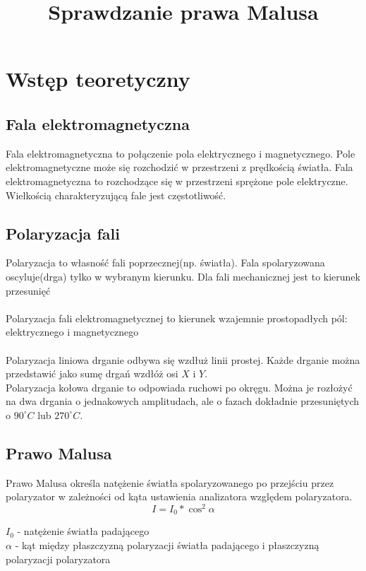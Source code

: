 \documentclass{article}
\begin{document}
\title{\huge\bfseries Sprawdzanie prawa Malusa}
\date{}
\author{}
\maketitle
\section{Wstęp teoretyczny}
\subsection{Fala elektromagnetyczna}
Fala elektromagnetyczna to połączenie pola elektrycznego i magnetycznego. Pole elektromagnetyczne może się rozchodzić w przestrzeni z prędkością światła. Fala elektromagnetyczna to rozchodzące się w przestrzeni sprężone pole elektryczne. Wielkością charakteryzującą fale jest częstotliwość.
\subsection{Polaryzacja fali}
Polaryzacja to własność fali poprzecznej(np. światła). Fala spolaryzowana oscyluje(drga) tylko w wybranym kierunku. Dla fali mechanicznej jest to kierunek przesunięć\\\\
Polaryzacja fali elektromagnetycznej to kierunek wzajemnie prostopadłych pól: elektrycznego i magnetycznego\\\\
Polaryzacja liniowa drganie odbywa się wzdłuż linii prostej. Każde drganie można przedstawić jako sumę drgań wzdłóż osi $X$ i $Y$.\\
Polaryzacja kołowa drganie to odpowiada ruchowi po okręgu. Można je rozłożyć na dwa drgania o jednakowych amplitudach, ale o fazach dokładnie przesuniętych o $90^{\circ}C$ lub $270^{\circ}C$.
\subsection{Prawo Malusa}
Prawo Malusa określa natężenie światła spolaryzowanego po przejściu przez polaryzator w zależności od kąta ustawienia analizatora względem polaryzatora.
$$I = I_0 * \cos^2\alpha$$

\begin{center}
$I_0$ - natężenie światła padającego \\
$\alpha$ - kąt między płaszczyzną polaryzacji światła padającego i płaszczyzną polaryzacji polaryzatora
\end{center}
\end{document}
